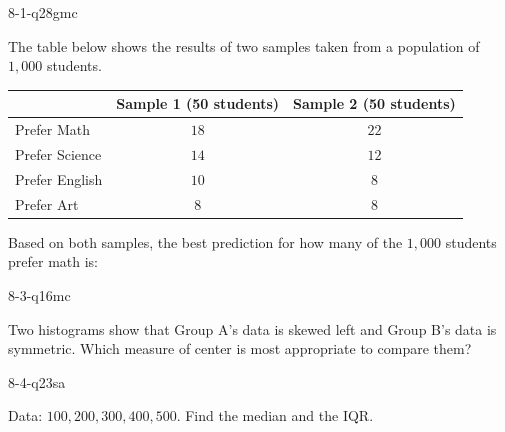 \begin{practiceQuestion}{8-1-q28}{gmc}
\begin{questionText}
The table below shows the results of two samples taken from a population of $1{,}000$ students.

\begin{center}
\begin{tabular}{|l|c|c|}
\hline
 & \textbf{Sample 1 (50 students)} & \textbf{Sample 2 (50 students)} \\
\hline
Prefer Math & $18$ & $22$ \\
\hline
Prefer Science & $14$ & $12$ \\
\hline
Prefer English & $10$ & $8$ \\
\hline
Prefer Art & $8$ & $8$ \\
\hline
\end{tabular}
\end{center}

Based on both samples, the best prediction for how many of the $1{,}000$ students prefer math is:
\end{questionText}
\end{practiceQuestion}

\begin{practiceQuestion}{8-3-q16}{mc}
\begin{questionText}
Two histograms show that Group A's data is skewed left and Group B's data is symmetric. Which measure of center is most appropriate to compare them?
\end{questionText}
\end{practiceQuestion}

\begin{practiceQuestion}{8-4-q23}{sa}
\begin{questionText}
Data: $100, 200, 300, 400, 500$. Find the median and the IQR.
\end{questionText}
\end{practiceQuestion}

